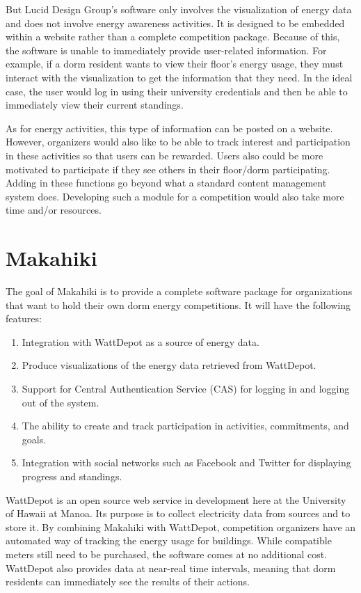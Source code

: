 But Lucid Design Group's software only involves the visualization of energy data and does not involve energy awareness activities.  It is designed to be embedded within a website rather than a complete competition package.  Because of this, the software is unable to immediately provide user-related information.  For example, if a dorm resident wants to view their floor's energy usage, they must interact with the visualization to get the information that they need.  In the ideal case, the user would log in using their university credentials and then be able to immediately view their current standings.

As for energy activities, this type of information can be posted on a website.  However, organizers would also like to be able to track interest and participation in these activities so that users can be rewarded.  Users also could be more motivated to participate if they see others in their floor/dorm participating.  Adding in these functions go beyond what a standard content management system does.  Developing such a module for a competition would also take more time and/or resources.

\section{Makahiki}

The goal of Makahiki is to provide a complete software package for organizations that want to hold their own dorm energy competitions.  It will have the following features:

\begin{enumerate}
	\item Integration with WattDepot as a source of energy data.
	\item Produce visualizations of the energy data retrieved from WattDepot.
	\item Support for Central Authentication Service (CAS) for logging in and logging out of the system.
	\item The ability to create and track participation in activities, commitments, and goals.
	\item Integration with social networks such as Facebook and Twitter for displaying progress and standings.
\end{enumerate}

WattDepot\cite{wattdepot} is an open source web service in development here at the University of Hawaii at Manoa.  Its purpose is to collect electricity data from sources and to store it.  By combining Makahiki with WattDepot, competition organizers have an automated way of tracking the energy usage for buildings.  While compatible meters still need to be purchased, the software comes at no additional cost.  WattDepot also provides data at near-real time intervals, meaning that dorm residents can immediately see the results of their actions.


